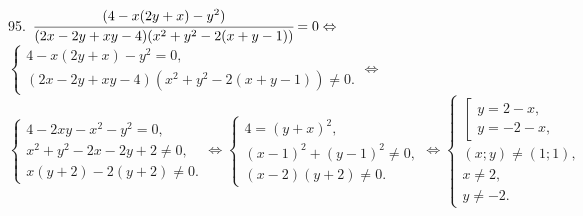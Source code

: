 \documentclass[12pt]{article}
\begin{document}
95. $\cfrac{(4-x(2y+x)-y^2)}{(2x-2y+xy-4)(x^2+y^2-2(x+y-1))}=0\Leftrightarrow$\\$
\begin{cases}

4-x(2y+x)-y^2=0,\\
(2x-2y+xy-4)(x^2+y^2-2(x+y-1))\neq0.
\end{cases}\Leftrightarrow$\\$
\begin{cases}
4-2xy-x^2-y^2=0,\\
x^2+y^2-2x-2y+2\neq0,\\
x(y+2)-2(y+2)\neq0.
\end{cases}\Leftrightarrow
\begin{cases}
4=(y+x)^2,\\
(x-1)^2+(y-1)^2\neq0,\\
(x-2)(y+2)\neq0.
\end{cases}\Leftrightarrow
\begin{cases}
\left[\begin{array}{l}
y=2-x,\\
y=-2-x,
\end{array}\right.\\
(x;y)\neq (1;1),\\
x\neq2,\\
y\neq-2.
\end{cases}$
\begin{figure}[ht!]
\end{figure}
\newpage
\end{document}
